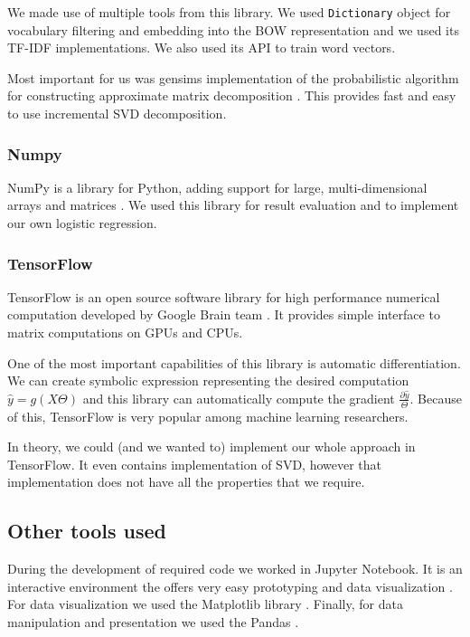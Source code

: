     We made use of multiple tools from this library. 
    We used \texttt{Dictionary} object for vocabulary filtering and embedding into the BOW representation and we used its TF-IDF implementations.
    We also used its API to train word vectors. 
    
    Most important for us was gensims implementation of the probabilistic algorithm for constructing approximate matrix decomposition \cite{halko2011finding}.
    This provides fast and easy to use incremental SVD decomposition.
    
    \subsubsection{Numpy}
    
    NumPy is a library for Python, adding support for large, multi-dimensional arrays and matrices \cite{oliphant2006guide}. %
    We used this library for result evaluation and to implement our own logistic regression.
    
    \subsubsection{TensorFlow}
    
    TensorFlow is an open source software library for high performance numerical computation developed by Google Brain team \cite{tensorflow2015-whitepaper}. 
    It provides simple interface to matrix computations on GPUs and CPUs.
    
    One of the most important capabilities of this library is automatic differentiation.
    We can create symbolic expression representing the desired computation $\hat{y}=g(X\Theta)$ and this library can automatically compute the gradient $\frac{\partial \hat{y}}{\Theta}$.
    Because of this, TensorFlow is very popular among  machine learning researchers.
    
    In theory, we could (and we wanted to) implement our whole approach in TensorFlow.
    It even contains implementation of SVD, however that implementation does not have all the properties that we require.
    
    \subsection{Other tools used}
    
    During the development of required code we worked in Jupyter Notebook. 
    It is an interactive environment the offers very easy prototyping and
    data visualization \cite{PER-GRA:2007}. %
    For data visualization we used the Matplotlib library \cite{hunter2007matplotlib}. %
    Finally, for data manipulation and presentation we used the Pandas \cite{mckinney2010data}. %
    
